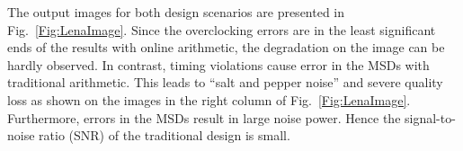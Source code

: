 \documentclass[journal]{IEEEtran}
\begin{document}
The output images for both design scenarios are presented in Fig.~\ref{Fig:LenaImage}. Since the overclocking errors are in the least significant ends of the results with online arithmetic, the degradation on the image can be hardly observed. In contrast, timing violations cause error in the MSDs with traditional arithmetic. This leads to ``salt and pepper noise'' and severe quality loss as shown on the images in the right column of Fig.~\ref{Fig:LenaImage}. Furthermore, errors in the MSDs result in large noise power. Hence the signal-to-noise ratio (SNR) of the traditional design is small.

\begin{figure}[htb]
  \centering
  \vspace{-1ex}
\end{figure}
\end{document}
